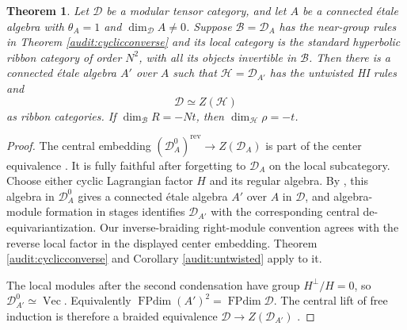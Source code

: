 \documentclass[11pt,a4paper]{article}
\numberwithin{equation}{section}
\newtheorem{theorem}{Theorem}[section]
\theoremstyle{definition}\newtheorem{definition}[theorem]{Definition}
\theoremstyle{remark}\newtheorem{remark}[theorem]{Remark}
\begin{document}
\begin{theorem}\label{audit:ribboncenter}
Let $\mathcal D$ be a modular tensor category, and let $A$ be a
connected \'etale algebra with $\theta_A=1$ and
$\dim_{\mathcal D}A\ne0$. Suppose
$\mathcal B=\mathcal D_A$ has the near-group rules in
Theorem \ref{audit:cyclicconverse} and its local category is the
standard hyperbolic ribbon category of order $N^2$, with all its
objects invertible in $\mathcal B$.
Then there is a connected \'etale algebra $A'$ over $A$ such that
$\mathcal H=\mathcal D_{A'}$ has the untwisted HI rules and
\[
                  \mathcal D\simeq Z(\mathcal H)
\]
as ribbon categories. If $\dim_{\mathcal B}R=-Nt$, then
$\dim_{\mathcal H}\rho=-t$.
\end{theorem}
\begin{proof}
The central embedding
$(\mathcal D_A^0)^{\mathrm{rev}}\to Z(\mathcal D_A)$ is part of
the center equivalence \cite[Corollary 3.30]{dmno}.
It is fully faithful after forgetting to $\mathcal D_A$ on the local
subcategory. Choose either cyclic Lagrangian factor $H$ and its
regular algebra. By \cite[Section 3.6 and Proposition 3.16]{dmno},
this algebra in $\mathcal D_A^0$ gives a connected \'etale algebra
$A'$ over $A$ in $\mathcal D$, and algebra-module formation in
stages identifies $\mathcal D_{A'}$ with the corresponding central
de-equivariantization. Our inverse-braiding right-module convention
agrees with the reverse local factor in the displayed center embedding.
Theorem \ref{audit:cyclicconverse} and Corollary \ref{audit:untwisted}
apply to it.

The local modules after the second condensation have group
$H^\perp/H=0$, so $\mathcal D_{A'}^0\simeq\operatorname{Vec}$.
Equivalently $\operatorname{FPdim}(A')^2=\operatorname{FPdim}\mathcal D$.
The central lift of free induction is therefore a braided equivalence
$\mathcal D\to Z(\mathcal D_{A'})$
\cite[Corollary 4.1]{dmno}.


\end{proof}
\end{document}
